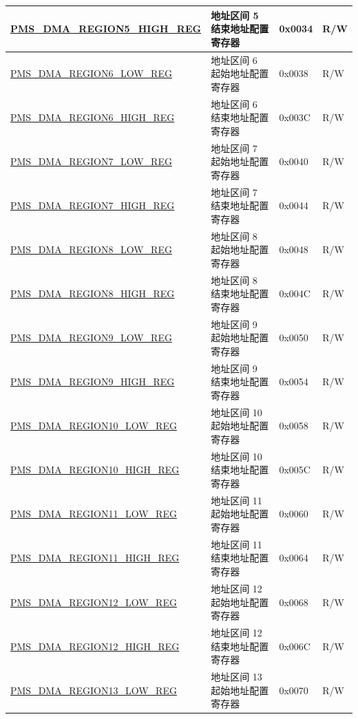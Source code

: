 \begin{longtable}{ | L{7.5cm} | L{6cm} | L{1.3cm} | L{1cm} | }
\hyperref[regdesc:PMSDMAREGIONNHIGHREG]{PMS\_DMA\_REGION5\_HIGH\_REG} & 地址区间 5 结束地址配置寄存器 & 0x0034 & R/W \\ \hline
\hyperref[regdesc:PMSDMAREGIONNLOWREG]{PMS\_DMA\_REGION6\_LOW\_REG} & 地址区间 6 起始地址配置寄存器 & 0x0038 & R/W \\ \hline
\hyperref[regdesc:PMSDMAREGIONNHIGHREG]{PMS\_DMA\_REGION6\_HIGH\_REG} & 地址区间 6 结束地址配置寄存器 & 0x003C & R/W \\ \hline
\hyperref[regdesc:PMSDMAREGIONNLOWREG]{PMS\_DMA\_REGION7\_LOW\_REG} & 地址区间 7 起始地址配置寄存器 & 0x0040 & R/W \\ \hline
\hyperref[regdesc:PMSDMAREGIONNHIGHREG]{PMS\_DMA\_REGION7\_HIGH\_REG} & 地址区间 7 结束地址配置寄存器 & 0x0044 & R/W \\ \hline
\hyperref[regdesc:PMSDMAREGIONNLOWREG]{PMS\_DMA\_REGION8\_LOW\_REG} & 地址区间 8 起始地址配置寄存器 & 0x0048 & R/W \\ \hline
\hyperref[regdesc:PMSDMAREGIONNHIGHREG]{PMS\_DMA\_REGION8\_HIGH\_REG} & 地址区间 8 结束地址配置寄存器 & 0x004C & R/W \\ \hline
\hyperref[regdesc:PMSDMAREGIONNLOWREG]{PMS\_DMA\_REGION9\_LOW\_REG} & 地址区间 9 起始地址配置寄存器 & 0x0050 & R/W \\ \hline
\hyperref[regdesc:PMSDMAREGIONNHIGHREG]{PMS\_DMA\_REGION9\_HIGH\_REG} & 地址区间 9 结束地址配置寄存器 & 0x0054 & R/W \\ \hline
\hyperref[regdesc:PMSDMAREGIONNLOWREG]{PMS\_DMA\_REGION10\_LOW\_REG} & 地址区间 10 起始地址配置寄存器 & 0x0058 & R/W \\ \hline
\hyperref[regdesc:PMSDMAREGIONNHIGHREG]{PMS\_DMA\_REGION10\_HIGH\_REG} & 地址区间 10 结束地址配置寄存器 & 0x005C & R/W \\ \hline
\hyperref[regdesc:PMSDMAREGIONNLOWREG]{PMS\_DMA\_REGION11\_LOW\_REG} & 地址区间 11 起始地址配置寄存器 & 0x0060 & R/W \\ \hline
\hyperref[regdesc:PMSDMAREGIONNHIGHREG]{PMS\_DMA\_REGION11\_HIGH\_REG} & 地址区间 11 结束地址配置寄存器 & 0x0064 & R/W \\ \hline
\hyperref[regdesc:PMSDMAREGIONNLOWREG]{PMS\_DMA\_REGION12\_LOW\_REG} & 地址区间 12 起始地址配置寄存器 & 0x0068 & R/W \\ \hline
\hyperref[regdesc:PMSDMAREGIONNHIGHREG]{PMS\_DMA\_REGION12\_HIGH\_REG} & 地址区间 12 结束地址配置寄存器 & 0x006C & R/W \\ \hline
\hyperref[regdesc:PMSDMAREGIONNLOWREG]{PMS\_DMA\_REGION13\_LOW\_REG} & 地址区间 13 起始地址配置寄存器 & 0x0070 & R/W \\ \hline

\end{longtable}
